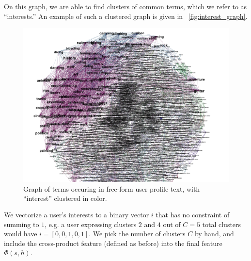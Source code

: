 On this graph, we are able to find clusters of common terms, which we refer to as ``interests.''
An example of such a clustered graph is given in ~\autoref{fig:interest_graph}.

\begin{figure}[ht]
\centering
\includegraphics[width=1\linewidth]{figures/interest_graph.png}
\caption{Graph of terms occuring in free-form user profile text, with ``interest'' clustered in color.}
\label{fig:interest_graph}
\end{figure}

We vectorize a user's interests to a binary vector $i$ that has no constraint of summing to $1$, e.g. a user expressing clusters $2$ and $4$ out of $C=5$ total clusters would have $i=[0,0,1,0,1]$.
We pick the number of clusters $C$ by hand, and include the cross-product feature (defined as before) into the final feature $\Phi(s,h)$.

